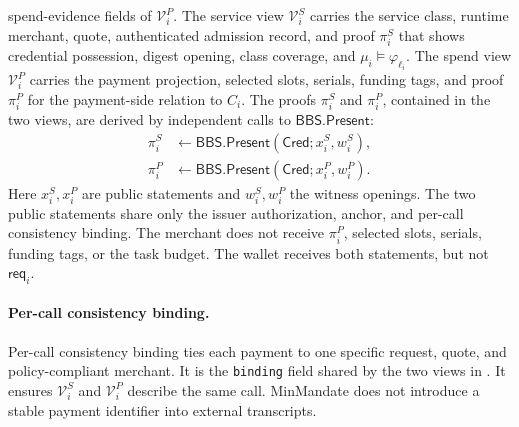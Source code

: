 \documentclass[letterpaper]{article}
\newcommand{\system}{MinMandate\xspace}
\begin{document}
spend-evidence fields of \(\mathcal V_i^P\).
The service view \(\mathcal{V}_i^S\) carries the service class, runtime
merchant, quote, authenticated admission record, and proof \(\pi_i^S\) that
shows credential possession, digest opening, class coverage, and
\(\mu_i\models\varphi_{\ell_i}\). The spend view \(\mathcal{V}_i^P\)
carries the payment projection, selected slots, serials, funding tags, and
proof \(\pi_i^P\) for the payment-side relation to \(C_i\).
The proofs \(\pi_i^S\) and \(\pi_i^P\), contained in the two views, are
derived by independent calls to \(\mathsf{BBS.Present}\):
\begin{equation}
\begin{aligned}
\pi_i^S &\leftarrow
\mathsf{BBS.Present}(\mathsf{Cred}; x_i^S, w_i^S),\\[2pt]
\pi_i^P &\leftarrow
\mathsf{BBS.Present}(\mathsf{Cred}; x_i^P, w_i^P).
\end{aligned}
\label{eq:role-proofs}
\end{equation}
Here \(x_i^S, x_i^P\) are public statements and \(w_i^S, w_i^P\) the
witness openings. The two public statements share only the issuer
authorization, anchor, and per-call consistency binding. The merchant does not
receive \(\pi_i^P\), selected slots,
serials, funding tags, or the task budget. The wallet receives both statements,
but not \(\mathsf{req}_i\).

\paragraph{Per-call consistency binding.}
\label{sec:per-call-consistency-binding}

Per-call consistency binding ties each payment to one specific request,
quote, and policy-compliant merchant. It is the \texttt{binding} field shared by
the two views in . It ensures \(\mathcal V_i^S\) and
\(\mathcal V_i^P\) describe the same call. \system does not introduce a stable
payment identifier into external transcripts.
\end{document}
